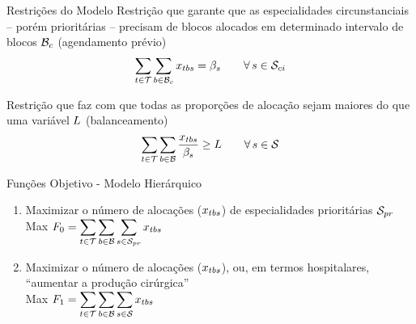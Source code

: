 \documentclass[10pt]{beamer}
\begin{document}
\begin{frame}{Restrições do Modelo}
    Restrição que garante que as especialidades circunstanciais -- porém prioritárias -- precisam de blocos alocados em determinado intervalo de blocos $\mathcal{B}_{c}$ (agendamento prévio)
    \begin{equation}
    \label{eq:m2-12}
        \sum_{t \in \mathcal{T}} \sum_{b \in \mathcal{B}_{c}} x_{tbs} = \beta_{s} \hspace{2em} \forall\, s \in \mathcal{S}_{ci}
    \end{equation}
    \vspace{2em}

    Restrição que faz com que todas as proporções de alocação sejam maiores do que uma variável $L$ (balanceamento)
    \begin{equation}
    \label{eq:m2-13}
         \sum_{t \in \mathcal{T}} \sum_{b \in \mathcal{B}} \frac{x_{tbs}}{\beta_{s}} \geq L \hspace{2em} \forall\, s \in \mathcal{S}
    \end{equation}
\end{frame}


\begin{frame}{Funções Objetivo - Modelo Hierárquico}
    \begin{enumerate}
        \setlength\itemsep{2em}
        \item Maximizar o número de alocações ($x_{tbs}$) de especialidades prioritárias $\mathcal{S}_{pr}$\\
        \vspace{0.5em}
        Max $\displaystyle F_0 = \sum_{t \in \mathcal{T}} \sum_{b \in \mathcal{B}} \sum_{s \in \mathcal{S}_{pr}} x_{tbs}$ 

        \item Maximizar o número de alocações ($x_{tbs}$), ou, em termos hospitalares, ``aumentar a produção cirúrgica''\\
        \vspace{0.5em}
        Max $\displaystyle F_1 = \sum_{t \in \mathcal{T}} \sum_{b \in \mathcal{B}} \sum_{s \in \mathcal{S}} x_{tbs}$ 
    \end{enumerate}
\end{frame}
\end{document}
